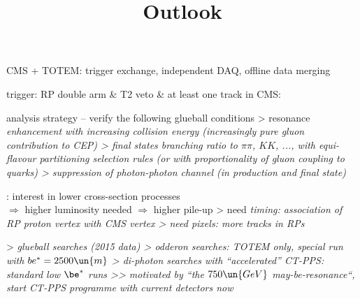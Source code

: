 \newpage %

\> CMS + TOTEM: trigger exchange, independent DAQ, offline data merging

\> trigger: RP double arm \& T2 veto \& at least one track in CMS:

\centerline{}

\> analysis strategy -- verify the following glueball conditions
\>> resonance \em{enhancement with increasing collision} energy (increasingly pure gluon contribution to CEP)
\>> final states \em{branching ratio to $\pi\pi$, $KK$, ...},  with equi-flavour partitioning selection rules (or with proportionality of
gluon coupling to quarks)
\>> \em{suppression of photon-photon} channel (in production and final state)



\newpage %
\title{Outlook}

\> : interest in lower cross-section processes\\ $\Rightarrow$ higher luminosity needed $\Rightarrow$ higher pile-up
\>> need \em{timing}: association of RP proton vertex with CMS vertex
\>> need \em{pixels}: more tracks in RPs

\cThird
\centerline{%
%
}



\> 
\>> \em{glueball} searches (2015 data)
\>> \em{odderon} searches: TOTEM only, special run with $be^* = 2500\un{m}$
\>> \em{di-photon} searches with ``accelerated'' CT-PPS: standard low $\be^*$ runs
\>>> motivated by ``the $750\un{GeV}$ may-be-resonance``, start CT-PPS programme with current detectors now


\newpage %


